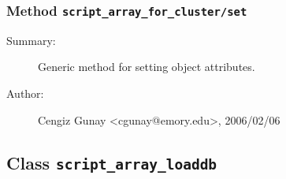 \subsubsection[Method \texttt{set}]{Method \texttt{script\_array\_for\_cluster/set}}%
%
\label{ref_script_array_for_cluster__set}%
\hypertarget{ref_script_array_for_cluster__set}{}%
\begin{description}
\item[Summary:]Generic method for setting object attributes.
%
%
%
%
%
%
%
\item[Author:]%
Cengiz Gunay <cgunay@emory.edu>, 2006/02/06
%
\end{description}
\methodline%
\subsection{Class \texttt{script\_array\_loaddb}}%
%
\label{ref_script_array_loaddb}%
\hypertarget{ref_script_array_loaddb}{}%
